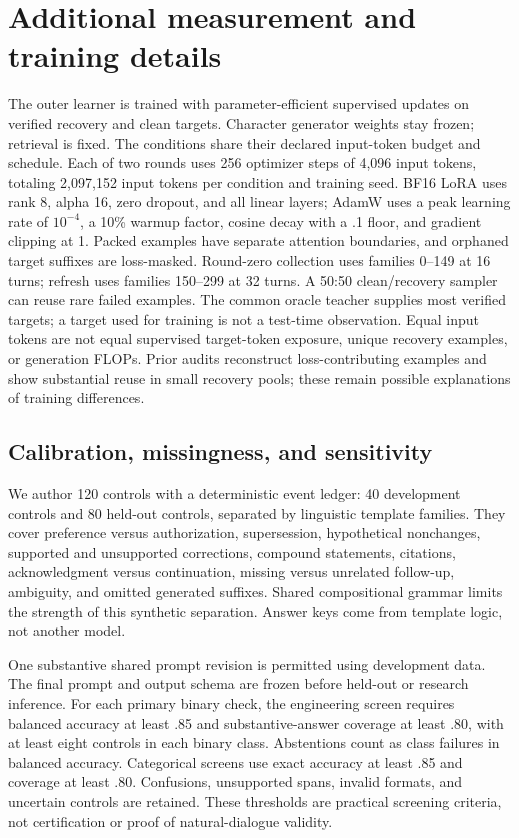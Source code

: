 \section{Additional measurement and training details}\label{app:methods}
The outer learner is trained with parameter-efficient supervised updates on verified recovery and clean targets. Character generator weights stay frozen; retrieval is fixed. The conditions share their declared input-token budget and schedule. Each of two rounds uses 256 optimizer steps of 4,096 input tokens, totaling 2,097,152 input tokens per condition and training seed. BF16 LoRA uses rank 8, alpha 16, zero dropout, and all linear layers; AdamW uses a peak learning rate of $10^{-4}$, a 10\% warmup factor, cosine decay with a .1 floor, and gradient clipping at 1. Packed examples have separate attention boundaries, and orphaned target suffixes are loss-masked. Round-zero collection uses families 0--149 at 16 turns; refresh uses families 150--299 at 32 turns. A 50:50 clean/recovery sampler can reuse rare failed examples. The common oracle teacher supplies most verified targets; a target used for training is not a test-time observation. Equal input tokens are not equal supervised target-token exposure, unique recovery examples, or generation FLOPs. Prior audits reconstruct loss-contributing examples and show substantial reuse in small recovery pools; these remain possible explanations of training differences.

\subsection{Calibration, missingness, and sensitivity}
We author 120 controls with a deterministic event ledger: 40 development controls and 80 held-out controls, separated by linguistic template families. They cover preference versus authorization, supersession, hypothetical nonchanges, supported and unsupported corrections, compound statements, citations, acknowledgment versus continuation, missing versus unrelated follow-up, ambiguity, and omitted generated suffixes. Shared compositional grammar limits the strength of this synthetic separation. Answer keys come from template logic, not another model.

One substantive shared prompt revision is permitted using development data. The final prompt and output schema are frozen before held-out or research inference. For each primary binary check, the engineering screen requires balanced accuracy at least .85 and substantive-answer coverage at least .80, with at least eight controls in each binary class. Abstentions count as class failures in balanced accuracy. Categorical screens use exact accuracy at least .85 and coverage at least .80. Confusions, unsupported spans, invalid formats, and uncertain controls are retained. These thresholds are practical screening criteria, not certification or proof of natural-dialogue validity.

